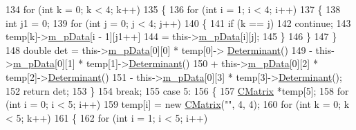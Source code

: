 \begin{DoxyCode}
134                     \textcolor{keywordflow}{for} (\textcolor{keywordtype}{int} k = 0; k < 4; k++)
135                     \{
136                         \textcolor{keywordflow}{for} (\textcolor{keywordtype}{int} i = 1; i < 4; i++)
137                         \{
138                             \textcolor{keywordtype}{int} j1 = 0;
139                             \textcolor{keywordflow}{for} (\textcolor{keywordtype}{int} j = 0; j < 4; j++)
140                             \{
141                                 \textcolor{keywordflow}{if} (k == j)
142                                     \textcolor{keywordflow}{continue};
143                                 temp[k]->\hyperlink{classCMatrix_ab0f18d68cad9b6d750d05a96b60a759d}{m\_pData}[i - 1][j1++]
144                                         = this->\hyperlink{classCMatrix_ab0f18d68cad9b6d750d05a96b60a759d}{m\_pData}[i][j];
145                             \}
146                         \}
147                     \}
148                     \textcolor{keywordtype}{double} det = this->\hyperlink{classCMatrix_ab0f18d68cad9b6d750d05a96b60a759d}{m\_pData}[0][0] * temp[0]->
      \hyperlink{classCMatrix_a865ff8f610be372e666fbf24d5b73a3a}{Determinant}()
149                             - this->\hyperlink{classCMatrix_ab0f18d68cad9b6d750d05a96b60a759d}{m\_pData}[0][1] * temp[1]->\hyperlink{classCMatrix_a865ff8f610be372e666fbf24d5b73a3a}{Determinant}()
150                             + this->\hyperlink{classCMatrix_ab0f18d68cad9b6d750d05a96b60a759d}{m\_pData}[0][2] * temp[2]->\hyperlink{classCMatrix_a865ff8f610be372e666fbf24d5b73a3a}{Determinant}()
151                             - this->\hyperlink{classCMatrix_ab0f18d68cad9b6d750d05a96b60a759d}{m\_pData}[0][3] * temp[3]->\hyperlink{classCMatrix_a865ff8f610be372e666fbf24d5b73a3a}{Determinant}();
152                     \textcolor{keywordflow}{return} det;
153                 \}
154                     \textcolor{keywordflow}{break};
155                 \textcolor{keywordflow}{case} 5:
156                 \{
157                     \hyperlink{classCMatrix}{CMatrix} *temp[5];
158                     \textcolor{keywordflow}{for} (\textcolor{keywordtype}{int} i = 0; i < 5; i++)
159                         temp[i] = \textcolor{keyword}{new} \hyperlink{classCMatrix_a720aa6a48296f4414ac7f9021bc420c4}{CMatrix}(\textcolor{stringliteral}{""}, 4, 4);
160                     \textcolor{keywordflow}{for} (\textcolor{keywordtype}{int} k = 0; k < 5; k++)
161                     \{
162                         \textcolor{keywordflow}{for} (\textcolor{keywordtype}{int} i = 1; i < 5; i++)

\end{DoxyCode}
